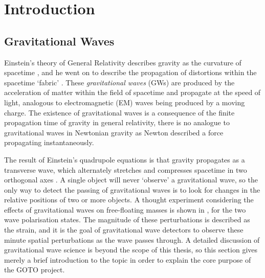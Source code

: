 \chapter{Introduction}
\label{chap:intro}
\chaptoc{}


\newpage
\section{Gravitational Waves}
\label{sec:gw}
\begin{colsection}


\begin{colsection}

Einstein's theory of General Relativity describes gravity as the curvature of spacetime \citep{Einstein1914}, and he went on to describe the propagation of distortions within the spacetime `fabric' \citep{Einstein1916}. These \emph{gravitational waves} (GWs) are produced by the acceleration of matter within the field of spacetime and propagate at the speed of light, analogous to electromagnetic (EM) waves being produced by a moving charge. The existence of gravitational waves is a consequence of the finite propagation time of gravity in general relativity, there is no analogue to gravitational waves in Newtonian gravity as Newton described a force propagating instantaneously.

The result of Einstein's quadrupole equations is that gravity propagates as a transverse wave, which alternately stretches and compresses spacetime in two orthogonal axes \citep{BIGcardiff}. A single object will never `observe' a gravitational wave, so the only way to detect the passing of gravitational waves is to look for changes in the relative positions of two or more objects. A thought experiment considering the effects of gravitational waves on free-floating masses is shown in , for the two wave polarisation states.  The magnitude of these perturbations is described as the strain, and it is the goal of gravitational wave detectors to observe these minute spatial perturbations as the wave passes through. A detailed discussion of gravitational wave science is beyond the scope of this thesis, so this section gives merely a brief introduction to the topic in order to explain the core purpose of the GOTO project.


\end{colsection}
\end{colsection}
